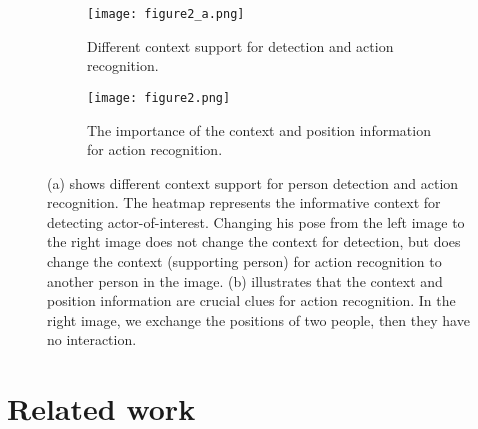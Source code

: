 \documentclass[final]{cvpr}
\begin{document}
\begin{figure}[t]
\begin{subfigure}{.5\textwidth}
\texttt{[image: figure2\_a.png]}
\centering
\caption{Different context support for detection and action recognition. }
\label{figure2:a}
\end{subfigure}
\begin{subfigure}{.5\textwidth}
\texttt{[image: figure2.png]}
\centering
\caption{The importance of the context and position information for action recognition. }
\vspace{-2mm}
\label{figure2:b}
\end{subfigure}
\centering
\caption{
(a) shows different context support for person detection and action recognition. The heatmap represents the informative context for detecting actor-of-interest. Changing his pose from the left image to the right image does not change the context for detection, but does change the context (supporting person) for action recognition to another person in the image.
(b) illustrates that the context and position information are crucial clues for action recognition. In the right image, we exchange the positions of two people, then they have no interaction.
}
\vspace{-5mm}
\label{figure2}
\end{figure}

\section{Related work}
\end{document}

